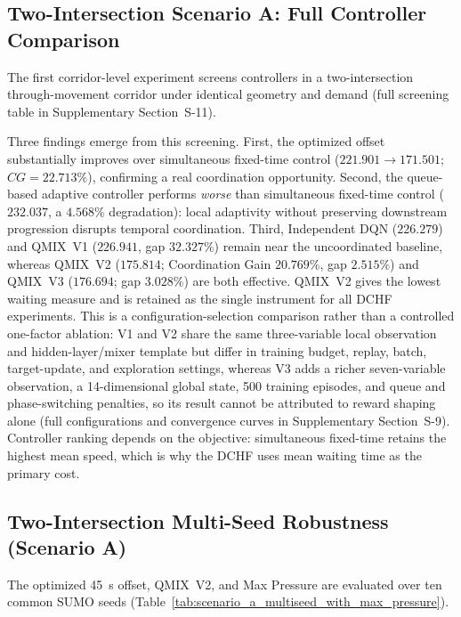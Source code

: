 \documentclass[review,12pt]{elsarticle}
\begin{document}
\subsection{Two-Intersection Scenario A: Full Controller Comparison}
\label{subsec:scenario_a}

The first corridor-level experiment screens controllers in a two-intersection through-movement corridor under identical geometry and demand (full screening table in Supplementary Section~S-11).

Three findings emerge from this screening. First, the optimized offset substantially improves over simultaneous fixed-time control ($221.901 \rightarrow 171.501$; $CG=22.713\%$), confirming a real coordination opportunity. Second, the queue-based adaptive controller performs \emph{worse} than simultaneous fixed-time control ($232.037$, a $4.568\%$ degradation): local adaptivity without preserving downstream progression disrupts temporal coordination. Third, Independent DQN ($226.279$) and QMIX~V1 ($226.941$, gap $32.327\%$) remain near the uncoordinated baseline, whereas QMIX~V2 ($175.814$; Coordination Gain $20.769\%$, gap $2.515\%$) and QMIX~V3 ($176.694$; gap $3.028\%$) are both effective. QMIX~V2 gives the lowest waiting measure and is retained as the single instrument for all DCHF experiments. This is a configuration-selection comparison rather than a controlled one-factor ablation: V1 and V2 share the same three-variable local observation and hidden-layer/mixer template but differ in training budget, replay, batch, target-update, and exploration settings, whereas V3 adds a richer seven-variable observation, a 14-dimensional global state, 500 training episodes, and queue and phase-switching penalties, so its result cannot be attributed to reward shaping alone (full configurations and convergence curves in Supplementary Section~S-9). Controller ranking depends on the objective: simultaneous fixed-time retains the highest mean speed, which is why the DCHF uses mean waiting time as the primary cost.


\subsection{Two-Intersection Multi-Seed Robustness (Scenario A)}
\label{subsec:multiseed_scenario_a}

The optimized 45~s offset, QMIX~V2, and Max Pressure are evaluated over ten common SUMO seeds (Table~\ref{tab:scenario_a_multiseed_with_max_pressure}).
\end{document}
